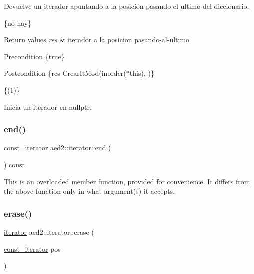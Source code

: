 Devuelve un iterador apuntando a la posición pasando-\/el-\/ultimo del diccionario. 

\{no hay\}


\begin{DoxyRetVals}{Return values}
{\em res} & iterador a la posicion pasando-\/al-\/ultimo\\
\hline
\end{DoxyRetVals}
\begin{DoxyPrecond}{Precondition}
\{true\} 
\end{DoxyPrecond}
\begin{DoxyPostcond}{Postcondition}
\{res  Crear\+It\+Mod(inorder($\ast$this),  )\}
\end{DoxyPostcond}
\{(1)\}

Inicia un iterador en nullptr. \mbox{\label{classaed2_1_1iterator_a66ee57cfa3bed6ffa74a1c8c23b13767}} 
\subsubsection{\texorpdfstring{end()}{end()}\hspace{0.1cm}{\footnotesize\ttfamily [2/2]}}
{\footnotesize\ttfamily \hyperlink{classaed2_1_1iterator_1_1const__iterator}{const\+\_\+iterator} aed2\+::iterator\+::end (\begin{DoxyParamCaption}{ }\end{DoxyParamCaption}) const\hspace{0.3cm}{\ttfamily [inline]}}

This is an overloaded member function, provided for convenience. It differs from the above function only in what argument(s) it accepts. \mbox{\label{classaed2_1_1iterator_adf371aaec9e68bd4a4d5a889d0b6b679}} 
\subsubsection{\texorpdfstring{erase()}{erase()}\hspace{0.1cm}{\footnotesize\ttfamily [1/2]}}
{\footnotesize\ttfamily \hyperlink{classaed2_1_1iterator_1_1iterator}{iterator} aed2\+::iterator\+::erase (\begin{DoxyParamCaption}\item[{\hyperlink{classaed2_1_1iterator_1_1const__iterator}{const\+\_\+iterator}}]{pos }\end{DoxyParamCaption})\hspace{0.3cm}{\ttfamily [inline]}}



